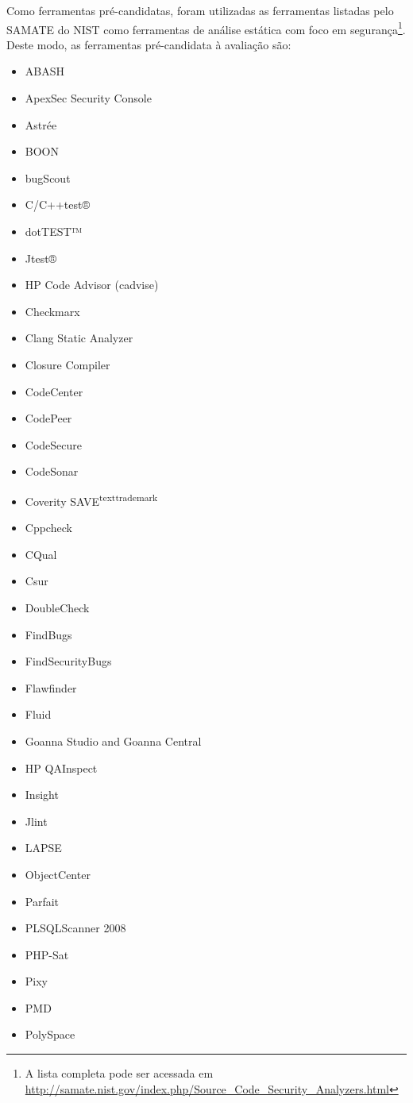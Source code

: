 Como ferramentas pré-candidatas, foram utilizadas as ferramentas listadas pelo SAMATE do NIST como ferramentas de análise estática com foco em segurança\footnote{A lista completa pode ser acessada em \url{http://samate.nist.gov/index.php/Source_Code_Security_Analyzers.html}}. Deste modo, as ferramentas pré-candidata à avaliação são:
\begin{itemize}
  \item ABASH
  \item ApexSec Security Console
  \item Astrée
  \item BOON
  \item bugScout
  \item C/C++test®
  \item dotTEST™
  \item Jtest®
  \item HP Code Advisor (cadvise)
  \item Checkmarx
  \item Clang Static Analyzer
  \item Closure Compiler
  \item CodeCenter
  \item CodePeer
  \item CodeSecure
  \item CodeSonar
  \item Coverity SAVE\textsuperscript{texttrademark}
  \item Cppcheck
  \item CQual
  \item Csur
  \item DoubleCheck
  \item FindBugs
  \item FindSecurityBugs
  \item Flawfinder
  \item Fluid
  \item Goanna Studio and Goanna Central
  \item HP QAInspect
  \item Insight
  \item Jlint
  \item LAPSE
  \item ObjectCenter
  \item Parfait
  \item PLSQLScanner 2008
  \item PHP-Sat
  \item Pixy
  \item PMD
  \item PolySpace

\end{itemize}
